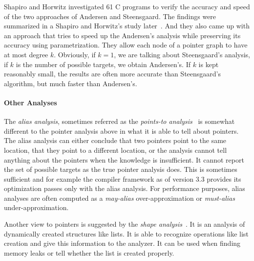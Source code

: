 Shapiro and Horwitz investigated 61 C programs to verify the accuracy and
speed of the two approaches of Andersen and Steensgaard. The findings were
summarized in a Shapiro and Horwitz's study later~\cite{shapiro_horwitz}. And
they also came up with an approach that tries to speed up the Andersen's
analysis while preserving its accuracy using parametrization. They allow each
node of a pointer graph to have at most degree $k$. Obviously, if $k=1$, we
are talking about Steensgaard's analysis, if $k$ is the number of possible
targets, we obtain Andersen's. If $k$ is kept reasonably small, the results are
often more accurate than Steensgaard's algorithm, but much faster than
Andersen's.

\paragraph{Other Analyses} The \emph{alias analysis}, sometimes referred as
the \emph{points-to analysis}~\cite{alias_anal} is somewhat different to the
pointer analysis above in what it is able to tell about pointers.  The alias
analysis can either conclude that two pointers point to the same location,
that they point to a different location, or the analysis cannot tell anything
about the pointers when the knowledge is insufficient. It cannot report the
set of possible targets as the true pointer analysis does. This is sometimes
sufficient and for example the compiler framework \llvm as of version 3.3
provides its optimization passes only with the alias analysis. For performance
purposes, alias analyses are often computed as a \emph{may-alias}
over-approximation or \emph{must-alias} under-approximation.

Another view to pointers is suggested by the \emph{shape
analysis}~\cite{ptr_shape}.  It is an analysis of dynamically created
structures like lists. It is able to recognize operations like list creation
and give this information to the analyzer. It can be used when finding memory
leaks or tell whether the list is created properly.

